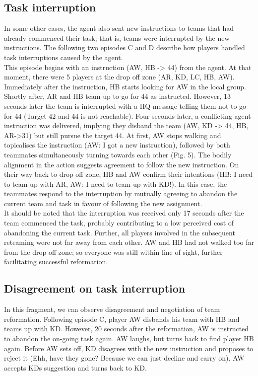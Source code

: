 \subsection{Task interruption}
In some other cases, the agent also sent new instructions to teams that had already commenced their task; that is, teams were interrupted by the new instructions. The following two episodes C and D describe how players handled task interruptions caused by the agent.\\

This episode begins with an instruction (AW, HB -> 44) from the agent. At that moment, there were 5 players at the drop off zone (AR, KD, LC, HB, AW). Immediately after the instruction, HB starts looking for AW in the local group. Shortly after, AR and HB team up to go for 44 as instructed.  However, 13 seconds later the team is interrupted with a HQ message telling them not to go for 44 (Target 42 and 44 is not reachable). Four seconds later, a conflicting agent instruction was delivered, implying they disband the team (AW, KD -> 44, HB, AR->31) but still pursue the target 44. At first, AW stops walking and topicalises the instruction (AW: I got a new instruction), followed by both teammates simultaneously turning towards each other (Fig. 5). The bodily alignment in the action suggests agreement to follow the new instruction. On their way back to drop off zone, HB and AW confirm their intentions (HB: I need to team up with AR, AW: I need to team up with KD!). In this case, the teammates respond to the interruption by mutually agreeing to abandon the current team and task in favour of following the new assignment. \\

It should be noted that the interruption was received only 17 seconds after the team commenced the task, probably contributing to a low perceived cost of abandoning the current task. Further, all players involved in the subsequent reteaming were not far away from each other. AW and HB had not walked too far from the drop off zone; so everyone was still within line of sight, further facilitating successful reformation. \\

\subsection{Disagreement on task interruption}

In this fragment, we can observe disagreement and negotiation of team reformation. Following episode C, player AW disbands his team with HB and teams up with KD. However, 20 seconds after the reformation, AW is instructed to abandon the on-going task again. AW laughs, but turns back to find player HB again. Before AW sets off, KD disagrees with the new instruction and proposes to reject it (Ehh, have they gone? Because we can just decline and carry on). AW accepts KDs suggestion and turns back to KD.\\

